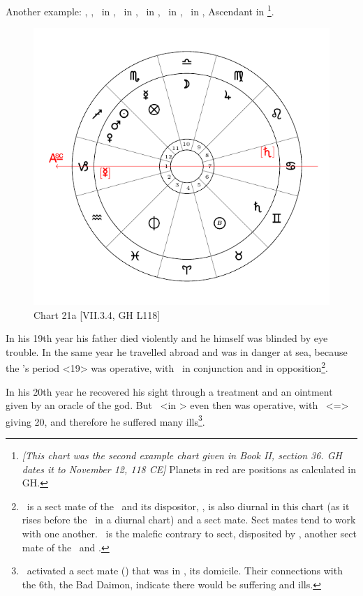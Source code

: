 \newpage
Another example: \Sun, \Mars, \Venus\, in \Sagittarius, \Moon\, in \Libra, \Saturn\, in \Gemini, \Jupiter\, in
\Virgo, \Mercury\, in \Scorpio, Ascendant in \Capricorn\footnote{\textit{[This chart was the second example chart given in Book II, section 36. GH dates it to November 12, 118 CE]} Planets in red are positions as calculated in GH.}.

\begin{figure}
\centering
\vspace{-2em}
\includegraphics[width=.68\textwidth]{charts/2_36_2}
\caption{Chart 21a [VII.3.4, GH L118]}
\label{fig:chart21a}
\end{figure} 

In his 19th year his father died violently and he himself was blinded by eye trouble. In the same year he travelled abroad and was in danger at sea, because the \Sun’s period <19> was operative, with \Mars\, in conjunction and \Saturn in opposition\footnote{\Saturn\, is a sect mate of the \Sun\, and its dispositor, \Mercury, is also diurnal in this chart (as it rises before the \Sun\, in a diurnal chart) and a sect mate. Sect mates tend to work with one another. \Mars\, is the malefic contrary to sect, disposited by \Jupiter, another sect mate of the \Sun\, and \Saturn.}. 

In his 20th year he recovered his sight through a treatment and an ointment given by an oracle of the god. But \Saturn\, <in
\Gemini> even then was operative, with \Gemini\, <=\Mercury> giving 20, and therefore he suffered many ills\footnote{\Mercury\, activated a sect mate (\Saturn) that was in \Gemini, its domicile. Their connections with the 6th, the Bad Daimon, indicate there would be suffering and ills.}.

